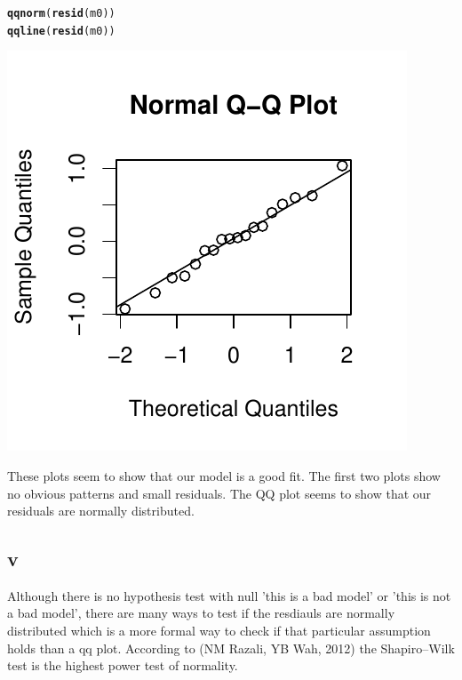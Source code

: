 \documentclass{article}\usepackage[]{graphicx}\usepackage[]{color}
\makeatletter
\def\maxwidth{ %
  \ifdim\Gin@nat@width>\linewidth
    \linewidth
  \else
    \Gin@nat@width
  \fi
}
\newcommand{\hlstd}[1]{\textcolor[rgb]{0.345,0.345,0.345}{#1}}%
\newcommand{\hlkwd}[1]{\textcolor[rgb]{0.737,0.353,0.396}{\textbf{#1}}}%
\newenvironment{kframe}{%
 \def\at@end@of@kframe{}%
 \ifinner\ifhmode%
  \def\at@end@of@kframe{\end{minipage}}%
  \begin{minipage}{\columnwidth}%
 \fi\fi%
 \def\FrameCommand##1{\hskip\@totalleftmargin \hskip-\fboxsep
 \colorbox{shadecolor}{##1}\hskip-\fboxsep
     \hskip-\linewidth \hskip-\@totalleftmargin \hskip\columnwidth}%
 \MakeFramed {\advance\hsize-\width
   \@totalleftmargin\z@ \linewidth\hsize
   \@setminipage}}%
 {\par\unskip\endMakeFramed%
 \at@end@of@kframe}
\newenvironment{knitrout}{}{} %
\makeatother
\begin{document}
\begin{knitrout}
\color{fgcolor}\begin{kframe}
\begin{alltt}
\hlkwd{qqnorm}\hlstd{(}\hlkwd{resid}\hlstd{(m0))}
\hlkwd{qqline}\hlstd{(}\hlkwd{resid}\hlstd{(m0))}
\end{alltt}
\end{kframe}

{\centering \includegraphics[width=\maxwidth]{figure/unnamed-chunk-8} 

}



\end{knitrout}


These plots seem to show that our model is a good fit. The first two plots show no obvious patterns and small residuals. The QQ plot seems to show that our residuals are normally distributed.
\subsection*{v}
Although there is no hypothesis test with null 'this is a bad model' or 'this is not a bad model', there are many ways to test if the resdiauls are normally distributed which is a more formal way to check if that particular assumption holds than a qq plot. According to (NM Razali, YB Wah, 2012) the Shapiro–Wilk test is the highest power test of normality.
\end{document}

